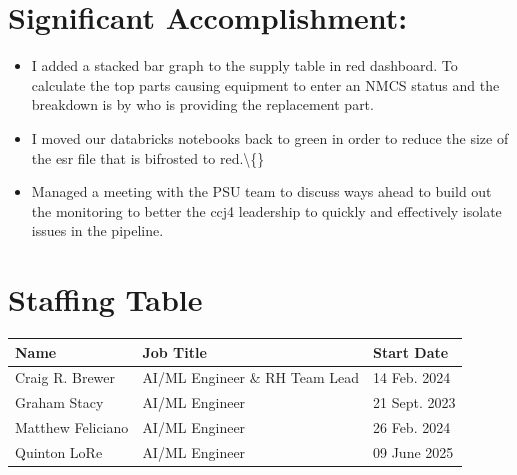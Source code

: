 \documentclass{article}
\begin{document}
\vspace{1.5cm}

\section*{ Significant Accomplishment: }
\label{sec:task_report_summary}

\begin{itemize}

  \item I added a stacked bar graph to the supply table in red dashboard. To calculate the top parts causing equipment to enter an NMCS status and the breakdown is by who is providing the replacement part.

  \item I moved our databricks notebooks back to green  in order to reduce the size of the esr file that is bifrosted to red.\textbackslash\{\}

  \item Managed a meeting with the PSU team to discuss ways ahead to build out the monitoring to better the ccj4 leadership to quickly and effectively isolate issues in the pipeline.

\end{itemize}

\vspace{1.5cm}

\section*{ Staffing Table }
\label{sec:staffing_table}

\noindent
\begin{tabularx}{\textwidth}{|l|X|l|}
\hline
\textbf{Name} & \textbf{Job Title} & \textbf{Start Date} \\
\hline
Craig R. Brewer & AI/ML Engineer \& RH Team Lead & 14 Feb. 2024 \\
\hline
Graham Stacy & AI/ML Engineer & 21 Sept. 2023 \\
\hline
Matthew Feliciano & AI/ML Engineer & 26 Feb. 2024 \\
\hline
Quinton LoRe & AI/ML Engineer & 09 June 2025 \\
\hline

\end{tabularx}
\end{document}
